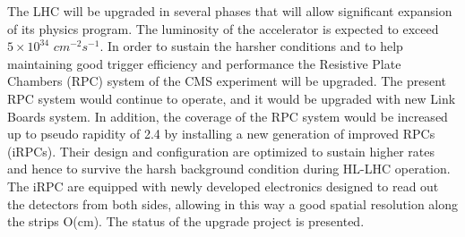 The LHC will be upgraded in several phases that will allow significant expansion of its physics program. The luminosity of the accelerator is expected to exceed $5 \times 10^{34}$ $cm^{-2}s^{-1}$.  In order to sustain the harsher conditions and to help maintaining good trigger efficiency and performance the Resistive Plate Chambers (RPC) system of the CMS experiment will be upgraded. The present RPC system would continue to operate, and it would be upgraded with new Link Boards system. In addition, the coverage of the RPC system would be increased up to pseudo rapidity of 2.4 by installing a new generation of improved RPCs (iRPCs). Their design and configuration are optimized to sustain higher rates and hence to survive the harsh background condition during HL-LHC operation. The iRPC are equipped with newly developed electronics designed to read out the detectors from both sides, allowing in this way a good spatial resolution along the strips O(cm). The status of the upgrade project is presented.